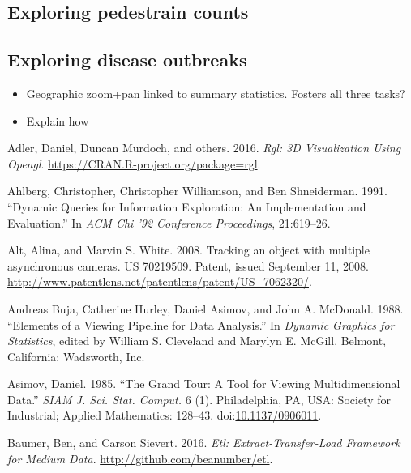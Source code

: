 \documentclass[12pt,]{isuthesis}
\providecommand{\tightlist}{%
  \setlength{\itemsep}{0pt}\setlength{\parskip}{0pt}}
\begin{document}
\subsection{Exploring pedestrain
counts}\label{exploring-pedestrain-counts}

\subsection{Exploring disease
outbreaks}\label{exploring-disease-outbreaks}

\begin{itemize}
\tightlist
\item
  Geographic zoom+pan linked to summary statistics. Fosters all three
  tasks?
\item
  Explain how
\end{itemize}


\hypertarget{refs}{}
\hypertarget{ref-rgl}{}
Adler, Daniel, Duncan Murdoch, and others. 2016. \emph{Rgl: 3D
Visualization Using Opengl}.
\url{https://CRAN.R-project.org/package=rgl}.

\hypertarget{ref-Ahlberg:1991}{}
Ahlberg, Christopher, Christopher Williamson, and Ben Shneiderman. 1991.
``Dynamic Queries for Information Exploration: An Implementation and
Evaluation.'' In \emph{ACM Chi '92 Conference Proceedings}, 21:619--26.

\hypertarget{ref-patent}{}
Alt, Alina, and Marvin S. White. 2008. Tracking an object with multiple
asynchronous cameras. US 70219509. Patent, issued September 11, 2008.
\url{http://www.patentlens.net/patentlens/patent/US_7062320/}.

\hypertarget{ref-viewing-pipeline}{}
Andreas Buja, Catherine Hurley, Daniel Asimov, and John A. McDonald.
1988. ``Elements of a Viewing Pipeline for Data Analysis.'' In
\emph{Dynamic Graphics for Statistics}, edited by William S. Cleveland
and Marylyn E. McGill. Belmont, California: Wadsworth, Inc.

\hypertarget{ref-grand-tour}{}
Asimov, Daniel. 1985. ``The Grand Tour: A Tool for Viewing
Multidimensional Data.'' \emph{SIAM J. Sci. Stat. Comput.} 6 (1).
Philadelphia, PA, USA: Society for Industrial; Applied Mathematics:
128--43. doi:\href{https://doi.org/10.1137/0906011}{10.1137/0906011}.

\hypertarget{ref-etl}{}
Baumer, Ben, and Carson Sievert. 2016. \emph{Etl: Extract-Transfer-Load
Framework for Medium Data}. \url{http://github.com/beanumber/etl}.
\end{document}
